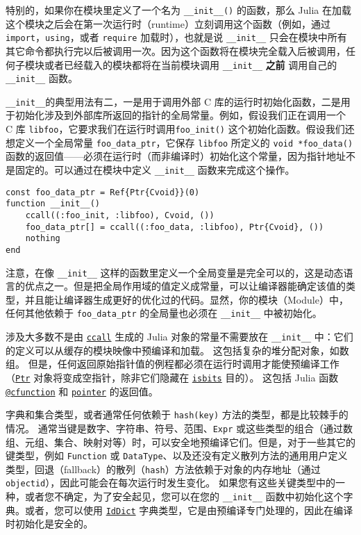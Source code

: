 特别的，如果你在模块里定义了一个名为 \texttt{\_\_init\_\_()} 的函数，那么 Julia 在加载这个模块之后会在第一次运行时（runtime）立刻调用这个函数（例如，通过 \texttt{import}，\texttt{using}，或者 \texttt{require} 加载时），也就是说 \texttt{\_\_init\_\_} 只会在模块中所有其它命令都执行完以后被调用一次。因为这个函数将在模块完全载入后被调用，任何子模块或者已经载入的模块都将在当前模块调用 \texttt{\_\_init\_\_} \textbf{之前} 调用自己的 \texttt{\_\_init\_\_} 函数。



\texttt{\_\_init\_\_}的典型用法有二，一是用于调用外部 C 库的运行时初始化函数，二是用于初始化涉及到外部库所返回的指针的全局常量。例如，假设我们正在调用一个 C 库 \texttt{libfoo}，它要求我们在运行时调用\texttt{foo\_init()} 这个初始化函数。假设我们还想定义一个全局常量 \texttt{foo\_data\_ptr}，它保存 \texttt{libfoo} 所定义的 \texttt{void *foo\_data()} 函数的返回值——必须在运行时（而非编译时）初始化这个常量，因为指针地址不是固定的。可以通过在模块中定义 \texttt{\_\_init\_\_} 函数来完成这个操作。




\begin{verbatim}
const foo_data_ptr = Ref{Ptr{Cvoid}}(0)
function __init__()
    ccall((:foo_init, :libfoo), Cvoid, ())
    foo_data_ptr[] = ccall((:foo_data, :libfoo), Ptr{Cvoid}, ())
    nothing
end
\end{verbatim}



注意，在像 \texttt{\_\_init\_\_} 这样的函数里定义一个全局变量是完全可以的，这是动态语言的优点之一。但是把全局作用域的值定义成常量，可以让编译器能确定该值的类型，并且能让编译器生成更好的优化过的代码。显然，你的模块（Module）中，任何其他依赖于 \texttt{foo\_data\_ptr} 的全局量也必须在 \texttt{\_\_init\_\_} 中被初始化。



涉及大多数不是由 \hyperlink{14245046751182637566}{\texttt{ccall}} 生成的 Julia 对象的常量不需要放在 \texttt{\_\_init\_\_} 中：它们的定义可以从缓存的模块映像中预编译和加载。 这包括复杂的堆分配对象，如数组。 但是，任何返回原始指针值的例程都必须在运行时调用才能使预编译工作（\hyperlink{10630331440513004826}{\texttt{Ptr}} 对象将变成空指针，除非它们隐藏在 \hyperlink{12980593021531333073}{\texttt{isbits}} 目的）。 这包括 Julia 函数 \hyperlink{11617107520401351255}{\texttt{@cfunction}} 和 \hyperlink{8901246211940014300}{\texttt{pointer}} 的返回值。



字典和集合类型，或者通常任何依赖于 \texttt{hash(key)} 方法的类型，都是比较棘手的情况。 通常当键是数字、字符串、符号、范围、\texttt{Expr} 或这些类型的组合（通过数组、元组、集合、映射对等）时，可以安全地预编译它们。但是，对于一些其它的键类型，例如 \texttt{Function} 或 \texttt{DataType}、以及还没有定义散列方法的通用用户定义类型，回退（fallback）的散列（\texttt{hash}）方法依赖于对象的内存地址（通过 \texttt{objectid}），因此可能会在每次运行时发生变化。 如果您有这些关键类型中的一种，或者您不确定，为了安全起见，您可以在您的 \texttt{\_\_init\_\_} 函数中初始化这个字典。或者，您可以使用 \hyperlink{14088500196255451490}{\texttt{IdDict}} 字典类型，它是由预编译专门处理的，因此在编译时初始化是安全的。



